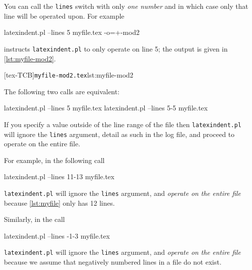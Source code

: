 \documentclass[10pt]{article}
\begin{document}
 \begin{example}
 You can call the \texttt{lines} switch with only \emph{one number} and in which case
 only that line will be operated upon. For example

 \begin{commandshell}
latexindent.pl --lines 5 myfile.tex -o=+-mod2
\end{commandshell}

 instructs \texttt{latexindent.pl} to only operate on line 5; the output is given in
 \cref{lst:myfile-mod2}.

 [tex-TCB]{\texttt{myfile-mod2.tex}}{lst:myfile-mod2}

 The following two calls are equivalent:

 \begin{commandshell}
latexindent.pl --lines 5 myfile.tex
latexindent.pl --lines 5-5 myfile.tex
\end{commandshell}

 \end{example}

 \begin{example}
 If you specify a value outside of the line range of the file then
 \texttt{latexindent.pl} will ignore the \texttt{lines} argument, detail as such in the
 log file, and proceed to operate on the entire file.

 For example, in the following call

 \begin{commandshell}
latexindent.pl --lines 11-13 myfile.tex
  \end{commandshell}

 \texttt{latexindent.pl} will ignore the \texttt{lines} argument, and \emph{operate on the entire file} because \cref{lst:myfile} only has 12 lines.

 Similarly, in the call

 \begin{commandshell}
latexindent.pl --lines -1-3 myfile.tex
  \end{commandshell}

 \texttt{latexindent.pl} will ignore the \texttt{lines} argument, and \emph{operate on the entire file} because we assume that negatively numbered
 lines in a file do not exist.
 \end{example}
\end{document}
